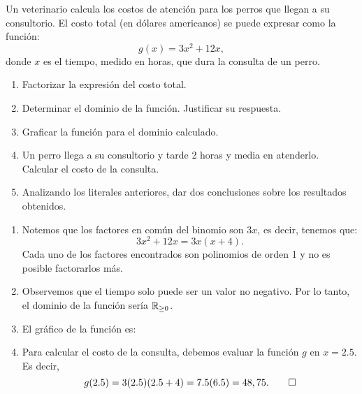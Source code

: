 \documentclass[11pt,respuestas,a4]{aleph-examen}
\begin{document}
\begin{preguntas}
\item 
    Un veterinario calcula los costos de atención para los perros que llegan a su consultorio. El costo total (en dólares americanos) se puede expresar como la función:
    \[
        g(x) = 3x^2 + 12x,
    \]
    donde $x$ es el tiempo, medido en horas, que dura la consulta de un perro.
    \begin{enumerate}[label=\textit{\alph*)}]
    \item 
        Factorizar la expresión del costo total.
    \item 
        Determinar el dominio de la función. Justificar su respuesta.
    \item 
        Graficar la función para el dominio calculado.
    \item 
        Un perro llega a su consultorio y tarde 2 horas y media en atenderlo. Calcular el costo de la consulta.
    \item 
        Analizando los literales anteriores, dar dos conclusiones sobre los resultados obtenidos.
    \end{enumerate}
\begin{respuesta}
\begin{enumerate}[label=\textit{\alph*)}]
	\item 
        Notemos que los factores en com\'un del binomio son $3x$, es decir, tenemos que:
    	\[
    	   3x^2 + 12x = 3x(x+4).
    	\]
    	Cada uno de los factores encontrados son polinomios de orden 1 y no es posible factorarlos más.
    	
    \item 
        Observemos que el tiempo solo puede ser un valor no negativo. Por lo tanto, el dominio de la función ser\'ia $\mathbb{R}_{\geq 0}$.
	
    \item 
        El gráfico de la función es:
        \begin{center}
        \end{center}
    
	\item 
        Para calcular el costo de la consulta, debemos evaluar la función $g$ en $x = 2.5$. Es decir,
    	\[
    	   g(2.5) = 3(2.5) (2.5+4) = 7.5(6.5) = 48,75.\qedhere
    	\]
\end{enumerate}
\end{respuesta}

\end{preguntas}
\end{document}
